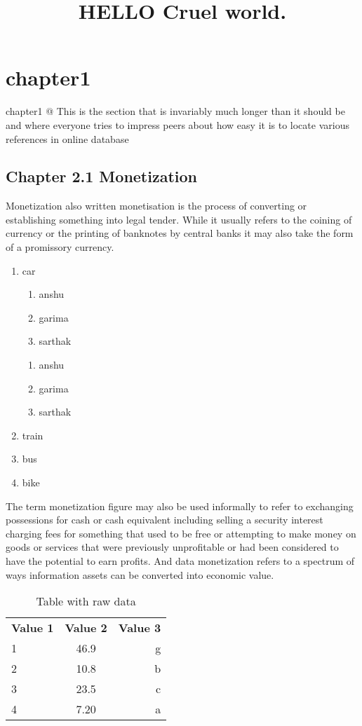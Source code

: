 \documentclass{article}
\title{HELLO Cruel world.}
\begin{document}
 \section{chapter1}
 
 chapter1
@ This is the section that is invariably much longer than it should be and
where everyone tries to impress peers about how easy it is to locate various references in online database

\subsection{Chapter 2.1 Monetization}

Monetization also written monetisation is the process of converting or establishing something into legal tender. While it usually refers to the coining of currency or the printing of banknotes by central banks it may also take the form of a promissory currency. \par

\begin{enumerate}
 \item car
 	\begin{enumerate}
  	\item anshu
 	 \item garima
	  \item sarthak
 	\end{enumerate}

	\begin{enumerate}
  	\item anshu
 	 \item garima
	  \item sarthak
 	\end{enumerate}

 \item train
  \item bus
  \item bike
\end{enumerate}


The term monetization figure may also be used informally to refer to exchanging possessions for cash or cash equivalent including selling a security interest charging fees for something that used to be free or attempting to make money on goods or services that were previously unprofitable or had been considered to have the potential to earn profits. And data monetization refers to a spectrum of ways information assets can be converted into economic value. 

\begin{table}
	\caption{Table with raw data}
	\label{tab1}
    \begin{tabular}{l|c|r}
      \textbf{Value 1} & \textbf{Value 2} & \textbf{Value 3} \\
      1 & 46.9 & g\\
      2 & 10.8 & b\\
      3 & 23.5 & c\\
      4 & 7.20 & a\\
\end{tabular}
 \end{table}
\end{document}
